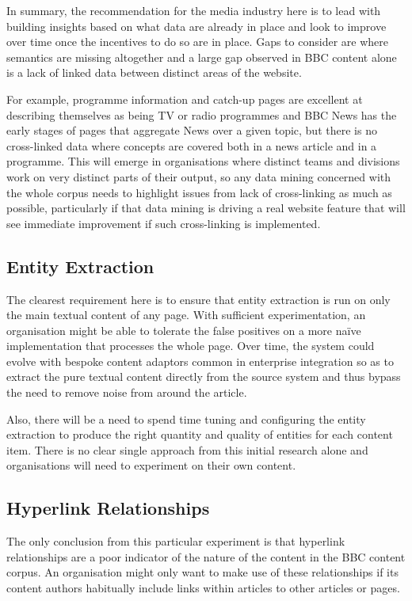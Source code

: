 In summary, the recommendation for the media industry here is to lead
with building insights based on what data are already in place and
look to improve over time once the incentives to do so are in place.
Gaps to consider are where semantics are missing altogether and a
large gap observed in BBC content alone is a lack of linked data
between distinct areas of the website.

For example, programme
information and catch-up pages are excellent at describing themselves
as being TV or radio programmes and BBC News has the early stages of
pages that aggregate News over a given topic, but there is no
cross-linked data where concepts are covered both in a news article
and in a programme. This will emerge in organisations where distinct
teams and divisions work on very distinct parts of their output, so
any data mining concerned with the whole corpus needs to highlight
issues from lack of cross-linking as much as possible, particularly
if that data mining is driving a real website feature that will see
immediate improvement if such cross-linking is implemented.

\subsection{Entity Extraction}

The clearest requirement here is to ensure that entity extraction
is run on only the main textual content of any page. With sufficient
experimentation, an organisation might be able to tolerate the false
positives on a more na\"ive implementation that processes the whole
page. Over time, the system could evolve with bespoke content
adaptors common in enterprise integration so as to extract the pure
textual content directly from the source system and thus bypass
the need to remove noise from around the article.

Also, there will be a need to spend time tuning and configuring
the entity extraction to produce the right quantity and quality of
entities for each content item. There is no clear single approach
from this initial research alone and organisations will need to
experiment on their own content.

\subsection{Hyperlink Relationships}

The only conclusion from this particular experiment is that
hyperlink relationships are a poor indicator of the nature of the
content in the BBC content corpus. An organisation might only want to
make use of these relationships if its content authors habitually
include links within articles to other articles or pages.
